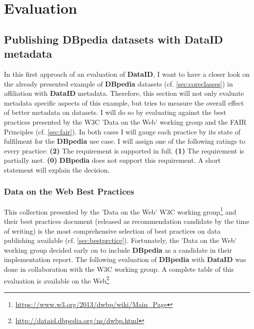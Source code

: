\documentclass[a4paper,english,twoside,BCOR1.5cm,headsepline,DIV12,appendixprefix,final,12pt]{scrbook}
\newcommand{\dataid}{{\ttfamily\bfseries DataID}\xspace}
\newcommand{\dbpedia}{{\ttfamily\bfseries DBpedia}\xspace}
\newcommand\footnoteurl[1]{\footnote{\scriptsize\url{#1}}}
\begin{document}
\chapter{Evaluation}
\label{chap:evaluation}

\section{Publishing DBpedia datasets with DataID metadata} 
\label{sec:evaldbpedia}
In this first approach of an evaluation of \dataid, I want to have a closer look on the already presented example of \dbpedia datasets (cf. \cref{sec:coreclasses}) in affiliation with \dataid metadata. Therefore, this section will not only evaluate metadata specific aspects of this example, but tries to measure the overall effect of better metadata on datasets.
I will do so by evaluating against the best practices presented by the W3C 'Data on the Web' working group and the FAIR Principles (cf. \cref{sec:fair}). In both cases I will gauge each practice by its state of fulfilment for the \dbpedia use case. I will assign one of the following ratings to every practice: \textbf{(2)} The requirement is supported in full. \textbf{(1)} The requirement is partially met. \textbf{(0)} \dbpedia does not support this requirement. A short statement will explain the decision.

\subsection{Data on the Web Best Practices} 
\label{sec:evaldwbp}
This collection presented by the 'Data on the Web' W3C working group\footnoteurl{https://www.w3.org/2013/dwbp/wiki/Main_Page} and their best practices document \cite{dwbpW3C2016} (released as recommendation candidate by the time of writing) is the most comprehensive selection of best practices on data publishing available (cf. \cref{sec:bestprctice}). Fortunately, the 'Data on the Web' working group decided early on to include \dbpedia as a candidate in their implementation report. The following evaluation of \dbpedia with \dataid was done in collaboration with the W3C working group. A complete table of this evaluation is available on the Web\footnoteurl{http://dataid.dbpedia.org/ns/dwbp.html}
\end{document}
